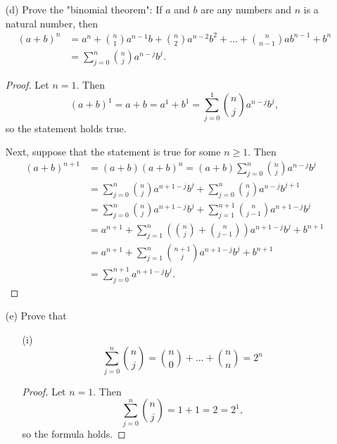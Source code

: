 \documentclass{article}
\begin{document}
\begin{enumerate}
	\begin{proof}
		The number of $k$-tuples of integers chosen from $1, \dots, n$ is $n(n - 1)\dots(n - k + 1)$, because there is $n$ choices for the first element, $n - 1$ choices for the second, etc. Now, for each $k$-tuple, it can be arranged in $k(k - 1)\dots(1) = k!$ different ways, so to get the number of sets of size $k$, with elements chosen from $1, \dots, n$, we have $\frac{n(n - 1)\dots(n - k + 1)}{k!} = \binom{n}{k}$.
	\end{proof}
	\item[(d)] Prove the "binomial theorem": If $a$ and $b$ are any numbers and $n$ is a natural number, then 
	\begin{align*}
		(a + b)^n &= a^n + \binom{n}{1}a^{n - 1}b + \binom{n}{2}a^{n-2}b^2 + \dots + \binom{n}{n - 1}ab^{n - 1} + b^n \\&=\sum_{j = 0}^{n}\binom{n}{j}a^{n - j}b^j.
	\end{align*}
	\begin{proof}
		Let $n = 1$. Then \[(a + b)^1 = a + b = a^1 + b^1 = \sum_{j = 0}^{1}\binom{n}{j}a^{n - j}b^j,\] so the statement holds true.

		Next, suppose that the statement is true for some $n \ge 1$. Then
		\begin{align*}
			(a + b)^{n + 1} &= (a + b)(a + b)^n = (a + b)\sum_{j = 0}^{n}\binom{n}{j}a^{n - j}b^j \\&= \sum_{j=0}^{n}\binom{n}{j}a^{n + 1 - j}b^j + \sum_{j=0}^{n}\binom{n}{j}a^{n - j}b^{j + 1} \\&= \sum_{j=0}^{n}\binom{n}{j}a^{n + 1 - j}b^j + \sum_{j = 1}^{n + 1}\binom{n}{j - 1}a^{n + 1 - j}b^j \\&= a^{n+1} + \sum_{j=1}^{n}(\binom{n}{j} + \binom{n}{j - 1})a^{n+1-j}b^j + b^{n + 1} \\&= a^{n+1} + \sum_{j=1}^{n}\binom{n+1}{j}a^{n+1-j}b^j + b^{n+1} \\&= \sum_{j=0}^{n+1}a^{n+1-j}b^j.
		\end{align*}
	\end{proof}
	\item[(e)] Prove that
	\begin{enumerate}
		\item[(i)] \[ \sum_{j=0}^{n}\binom{n}{j} = \binom{n}{0} + \dots + \binom{n}{n} = 2^n \]
		\begin{proof}
			Let $n = 1$. Then \[ \sum_{j = 0}^{n}\binom{n}{j} = 1 + 1 = 2 = 2^1, \]so the formula holds.


\end{proof}
\end{enumerate}
\end{enumerate}
\end{document}
